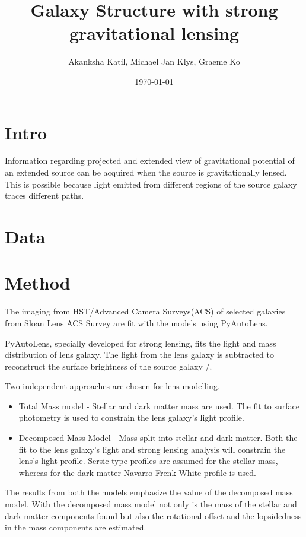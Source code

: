 \documentclass{article}
\title{Galaxy Structure with strong gravitational lensing}
\author{Akanksha Katil, Michael Jan Klys, Graeme Ko}
\date{\today}
\begin{document}
\maketitle

\section{Intro}
Information regarding projected and extended view of gravitational potential of an extended source can be acquired when the source is gravitationally lensed. This is possible because light emitted from different regions of the source galaxy traces different paths.\cite{Nightingale_2019}


\section{Data}


\section{Method}

The imaging from HST/Advanced Camera Surveys(ACS) of selected galaxies from Sloan Lens ACS Survey\cite{bolton2008sloan} are fit with the models using PyAutoLens\cite{Nightingale_2021}. 

PyAutoLens, specially developed for strong lensing, fits the light and mass distribution of lens galaxy. The light from the lens galaxy is subtracted to reconstruct the surface brightness of the source galaxy /\cite{Nightingale_2021}. 

Two independent approaches are chosen for lens modelling\cite{Nightingale_2019}.

\begin{itemize}
    \item Total Mass model - Stellar and dark matter mass are used. The fit to surface photometry is used to constrain the lens galaxy's light profile\cite{Nightingale_2019}.
    \item Decomposed Mass Model - Mass split into stellar and dark matter. Both the fit to the lens galaxy's light and strong lensing analysis will constrain the lens's light profile. Sersic type profiles are assumed for the stellar mass, whereas for the dark matter Navarro-Frenk-White profile is used\cite{Nightingale_2019}.
\end{itemize}

The results from both the models emphasize the value of the decomposed mass model. With the decomposed mass model not only is the mass of the stellar and dark matter components found but also the rotational offset and the lopsidedness in the mass components are estimated.

\newpage

\printbibliography
\end{document}
